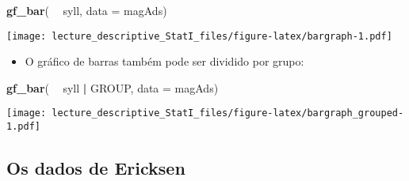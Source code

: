 \documentclass[]{article}
\newenvironment{Shaded}{\begin{snugshade}}{\end{snugshade}}
\newcommand{\KeywordTok}[1]{\textcolor[rgb]{0.13,0.29,0.53}{\textbf{#1}}}
\newcommand{\DataTypeTok}[1]{\textcolor[rgb]{0.13,0.29,0.53}{#1}}
\newcommand{\StringTok}[1]{\textcolor[rgb]{0.31,0.60,0.02}{#1}}
\newcommand{\OperatorTok}[1]{\textcolor[rgb]{0.81,0.36,0.00}{\textbf{#1}}}
\newcommand{\NormalTok}[1]{#1}
\providecommand{\tightlist}{%
  \setlength{\itemsep}{0pt}\setlength{\parskip}{0pt}}
\begin{document}
\begin{Shaded}
\begin{Highlighting}[]
\KeywordTok{gf_bar}\NormalTok{( }\OperatorTok{~}\StringTok{ }\NormalTok{syll, }\DataTypeTok{data =}\NormalTok{ magAds)}
\end{Highlighting}
\end{Shaded}

\texttt{[image: lecture\_descriptive\_StatI\_files/figure-latex/bargraph-1.pdf]}

\begin{itemize}
\tightlist
\item
  O gráfico de barras também pode ser dividido por grupo:
\end{itemize}

\begin{Shaded}
\begin{Highlighting}[]
\KeywordTok{gf_bar}\NormalTok{( }\OperatorTok{~}\StringTok{ }\NormalTok{syll }\OperatorTok{|}\StringTok{ }\NormalTok{GROUP, }\DataTypeTok{data =}\NormalTok{ magAds)}
\end{Highlighting}
\end{Shaded}

\texttt{[image: lecture\_descriptive\_StatI\_files/figure-latex/bargraph\_grouped-1.pdf]}

\subsection{Os dados de Ericksen}\label{os-dados-de-ericksen}
\end{document}
